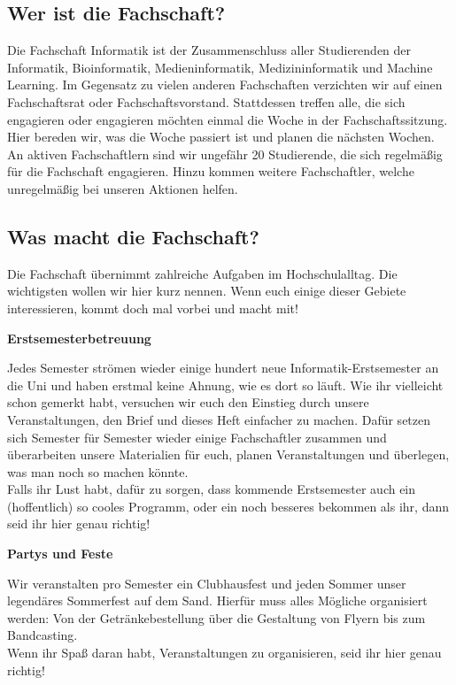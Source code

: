 \subsection{Wer ist die Fachschaft?}
Die Fachschaft Informatik ist der Zusammenschluss aller Studierenden der
Informatik, Bioinformatik, Medieninformatik, Medizininformatik und Machine Learning. 
Im Gegensatz zu vielen anderen Fachschaften verzichten wir auf einen
Fachschaftsrat oder Fachschaftsvorstand. Stattdessen treffen alle, die sich
engagieren oder engagieren möchten einmal die Woche in der Fachschaftssitzung.
Hier bereden wir, was die Woche passiert ist und planen die nächsten Wochen. An
aktiven Fachschaftlern sind wir ungefähr 20 Studierende, die sich regelmäßig
für die Fachschaft engagieren. Hinzu kommen weitere Fachschaftler, welche
unregelmäßig bei unseren Aktionen helfen.

\subsection{Was macht die Fachschaft?}
Die Fachschaft übernimmt zahlreiche Aufgaben im Hochschulalltag. Die
wichtigsten wollen wir hier kurz nennen. Wenn euch einige dieser Gebiete
interessieren, kommt doch mal vorbei und macht mit!

\textbf{Erstsemesterbetreuung}

Jedes Semester strömen wieder einige hundert neue Informatik-Erstsemester an
die Uni und haben erstmal keine Ahnung, wie es dort so läuft. Wie ihr
vielleicht schon gemerkt habt, versuchen wir euch den Einstieg durch unsere
Veranstaltungen, den Brief und dieses Heft einfacher zu machen. Dafür setzen
sich Semester für Semester wieder einige Fachschaftler zusammen und
überarbeiten unsere Materialien für euch, planen Veranstaltungen und überlegen,
was man noch so machen könnte.\\ 
Falls ihr Lust habt, dafür zu sorgen, dass kommende Erstsemester auch ein
(hoffentlich) so cooles Programm, oder ein noch besseres bekommen als ihr, dann
seid ihr hier genau richtig!

\textbf{Partys und Feste}

Wir veranstalten pro Semester ein Clubhausfest und jeden Sommer unser
legendäres Sommerfest auf dem Sand. Hierfür muss alles Mögliche organisiert
werden: Von der Getränkebestellung über die Gestaltung von Flyern bis zum
Bandcasting. \\
Wenn ihr Spaß daran habt, Veranstaltungen zu organisieren, seid ihr hier genau
richtig!

